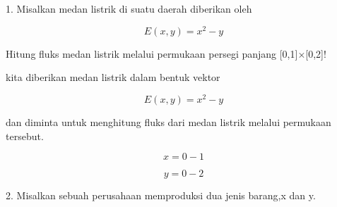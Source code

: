 \documentclass[a4paper,10pt]{article}
\begin{document}
\begin{eulernotebook}
\begin{eulercomment}
\begin{eulercomment}
\begin{eulercomment}
\begin{eulercomment}
\begin{eulercomment}
\begin{eulercomment}
\begin{eulercomment}
\begin{eulercomment}
\begin{eulercomment}
\begin{eulercomment}
\begin{eulercomment}
\begin{eulercomment}
\begin{eulercomment}
\begin{eulercomment}
\begin{eulercomment}
\begin{eulercomment}
\begin{eulercomment}
\begin{eulercomment}
\begin{eulercomment}
\begin{eulercomment}
\begin{eulercomment}
\begin{eulercomment}
\begin{eulercomment}
\begin{eulercomment}
\begin{eulercomment}
\begin{eulercomment}
\begin{eulercomment}
\begin{eulercomment}
\begin{eulercomment}
\begin{eulercomment}
\begin{eulercomment}
\begin{eulercomment}
\begin{eulercomment}
\begin{eulercomment}
\begin{eulercomment}
\begin{eulercomment}
\begin{eulercomment}
1. Misalkan medan listrik di suatu daerah diberikan oleh\\
\end{eulercomment}
\begin{eulerformula}
\[
E(x,y)=x^2 - y
\]
\end{eulerformula}
\begin{eulercomment}
Hitung fluks medan listrik melalui permukaan persegi panjang
[0,1]×[0,2]!

\end{eulercomment}
\begin{eulercomment}
kita diberikan medan listrik dalam bentuk vektor\\
\end{eulercomment}
\begin{eulerformula}
\[
E(x,y)=x^2-y
\]
\end{eulerformula}
\begin{eulercomment}
dan diminta untuk menghitung fluks dari medan listrik melalui
permukaan tersebut.\\
\end{eulercomment}
\begin{eulerformula}
\[
x=0-1
\]
\end{eulerformula}
\begin{eulerformula}
\[
y=0-2
\]
\end{eulerformula}
\begin{eulercomment}
2. Misalkan sebuah perusahaan memproduksi dua jenis barang,x dan y.\\

\end{eulercomment}
\end{eulercomment}
\end{eulercomment}
\end{eulercomment}
\end{eulercomment}
\end{eulercomment}
\end{eulercomment}
\end{eulercomment}
\end{eulercomment}
\end{eulercomment}
\end{eulercomment}
\end{eulercomment}
\end{eulercomment}
\end{eulercomment}
\end{eulercomment}
\end{eulercomment}
\end{eulercomment}
\end{eulercomment}
\end{eulercomment}
\end{eulercomment}
\end{eulercomment}
\end{eulercomment}
\end{eulercomment}
\end{eulercomment}
\end{eulercomment}
\end{eulercomment}
\end{eulercomment}
\end{eulercomment}
\end{eulercomment}
\end{eulercomment}
\end{eulercomment}
\end{eulercomment}
\end{eulercomment}
\end{eulercomment}
\end{eulercomment}
\end{eulercomment}
\end{eulercomment}
\end{eulernotebook}
\end{document}
